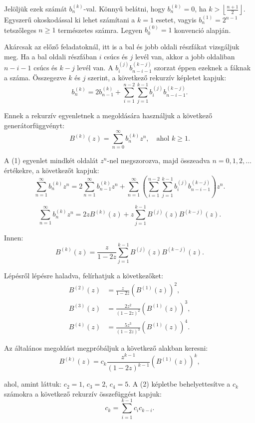 \begin{solution}
Jelöljük ezek számát $b_{n}^{(k)}$-val. Könnyű belátni, hogy $b_{n}^{(k)}=0$,
ha $k>\left\lfloor \frac{n+1}{2}\right\rfloor $. Egyszerű okoskodással
ki lehet számítani a $k=1$ esetet, vagyis $b_{n}^{(1)}=2^{n-1}$
tetszőleges $n\geq1$ természetes számra. Legyen $b_{0}^{(0)}=1$
konvenció alapján.

Akárcsak az előző feladatoknál, itt is a bal és jobb oldali részfákat
vizsgáljuk meg. Ha a bal oldali részfában $i$ csúcs és $j$ levél
van, akkor a jobb oldaliban $n-i-1$ csúcs és $k-j$ levél van. A
$b_{i}^{(j)}b_{n-i-1}^{(k-j)}$ szorzat éppen ezeknek a fáknak a száma.
Összegezve $k$ és $j$ szerint, a következő rekurzív képletet kapjuk:
\begin{equation}
b_{n}^{(k)}=2b_{n-1}^{(k)}+\sum_{i=1}^{n-2}\sum_{j=1}^{k-1}b_{i}^{(j)}b_{n-i-1}^{(k-j)}.\tag{1}
\end{equation}

Ennek a rekurzív egyenletnek a megoldására használjuk a következő
generátorfüggvényt: 
\[
B^{(k)}(z)=\sum_{n=0}^{\infty}b_{n}^{(k)}z^{n},\quad\text{ahol }k\geq1.
\]

A (1) egyenlet mindkét oldalát $z^{n}$-nel megszorozva, majd összeadva
$n=0,1,2,\dots$ értékekre, a következőt kapjuk: 
\[
\sum_{n=1}^{\infty}b_{n}^{(k)}z^{n}=2\sum_{n=1}^{\infty}b_{n-1}^{(k)}z^{n}+\sum_{n=1}^{\infty}\left(\sum_{i=1}^{n-2}\sum_{j=1}^{k-1}b_{i}^{(j)}b_{n-i-1}^{(k-j)}\right)z^{n}.
\]

\[
\sum_{n=1}^{\infty}b_{n}^{(k)}z^{n}=2zB^{(k)}(z)+z\sum_{j=1}^{k-1}B^{(j)}(z)B^{(k-j)}(z).
\]

Innen: 
\begin{equation}
B^{(k)}(z)=\frac{z}{1-2z}\sum_{j=1}^{k-1}B^{(j)}(z)B^{(k-j)}(z).\tag{2}
\end{equation}

Lépésről lépésre haladva, felírhatjuk a következőket: 
\begin{align*}
B^{(2)}(z) & =\frac{z}{1-2z}\left(B^{(1)}(z)\right)^{2},\\
B^{(3)}(z) & =\frac{2z^{2}}{(1-2z)^{2}}\left(B^{(1)}(z)\right)^{3},\\
B^{(4)}(z) & =\frac{5z^{3}}{(1-2z)^{3}}\left(B^{(1)}(z)\right)^{4}.
\end{align*}

Az általános megoldást megpróbáljuk a következő alakban keresni: 
\[
B^{(k)}(z)=c_{k}\frac{z^{k-1}}{(1-2z)^{k-1}}\left(B^{(1)}(z)\right)^{k},
\]

ahol, amint láttuk: $c_{2}=1$, $c_{3}=2$, $c_{4}=5$. A (2) képletbe
behelyettesítve a $c_{k}$ számokra a következő rekurzív összefüggést
kapjuk: 
\[
c_{k}=\sum_{i=1}^{k-1}c_{i}c_{k-i}.
\]


\end{solution}
